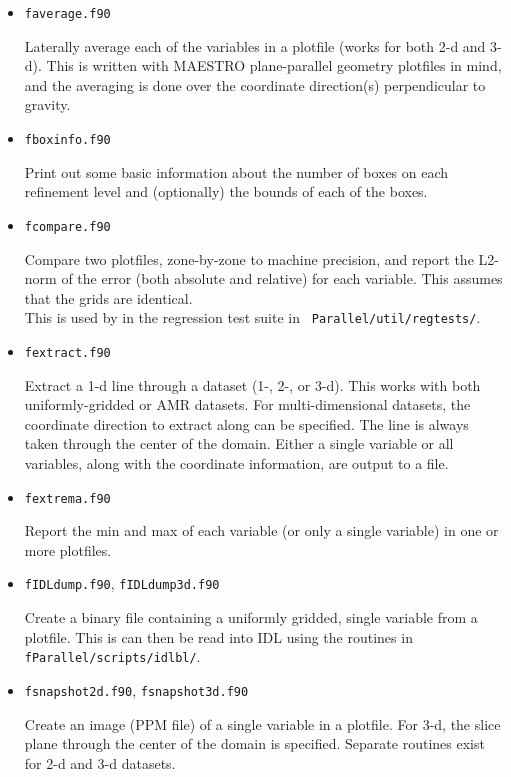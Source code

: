 \begin{itemize}

\item {\tt faverage.f90}

  Laterally average each of the variables in a plotfile (works for
  both 2-d and 3-d).  This is written with MAESTRO
  plane-parallel geometry plotfiles in mind, and the averaging is done
  over the coordinate direction(s) perpendicular to gravity.


\item {\tt fboxinfo.f90}

  Print out some basic information about the number of boxes on each
  refinement level and (optionally) the bounds of each of the boxes.

\item {\tt fcompare.f90}

  Compare two plotfiles, zone-by-zone to machine precision, and report
  the L2-norm of the error (both absolute and relative) for each
  variable.  This assumes that the grids are identical. \\[-3mm]

  This is used by in the regression test suite in {\tt
  Parallel/util/regtests/}.


\item {\tt fextract.f90}

  Extract a 1-d line through a dataset (1-, 2-, or 3-d).  This works
  with both uniformly-gridded or AMR datasets.  For multi-dimensional
  datasets, the coordinate direction to extract along can be specified.
  The line is always taken through the center of the domain.  Either
  a single variable or all variables, along with the coordinate 
  information, are output to a file.
  

\item {\tt fextrema.f90}

  Report the min and max of each variable (or only a single variable)
  in one or more plotfiles.


\item {\tt fIDLdump.f90}, {\tt fIDLdump3d.f90}

  Create a binary file containing a uniformly gridded, single variable
  from a plotfile.  This is can then be read into IDL using the routines
  in {\tt fParallel/scripts/idlbl/}.


\item {\tt fsnapshot2d.f90}, {\tt fsnapshot3d.f90}

  Create an image (PPM file) of a single variable in a plotfile.  For
  3-d, the slice plane through the center of the domain is specified.
  Separate routines exist for 2-d and 3-d datasets.
  


\end{itemize}

